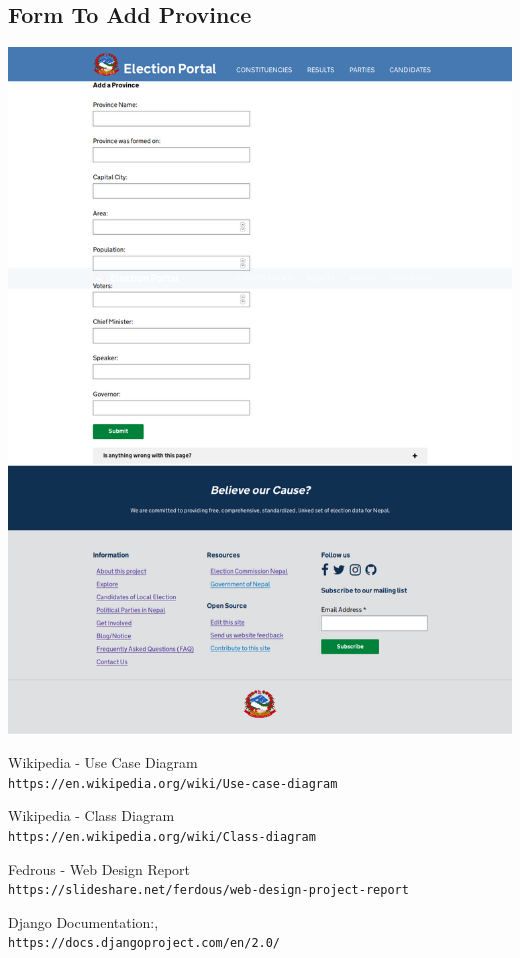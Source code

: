 \documentclass[12pt, a4paper, titlepage]{report}
\begin{document}
\subsection{Form To Add Province}
\begin{center}
\includegraphics[scale=0.25]{Form_To_Add_Province.png}
\end{center}





\begin{thebibliography}{9}
 
Wikipedia - Use Case Diagram
\\\texttt{https://en.wikipedia.org/wiki/Use-case-diagram}

Wikipedia - Class Diagram
\\\texttt{https://en.wikipedia.org/wiki/Class-diagram}

Fedrous - Web Design Report
\\\texttt{https://slideshare.net/ferdous/web-design-project-report}
 
Django Documentation:,
\\\texttt{https://docs.djangoproject.com/en/2.0/}
\end{thebibliography}
\end{document}
